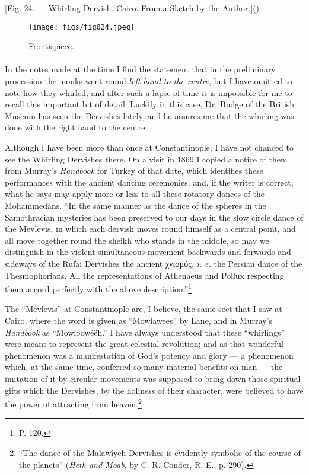 \documentclass[a4paper, 11pt, oneside, polutonikogreek, english]{article}
\begin{document}
[Fig. 24. --- Whirling Dervish. Cairo. From a Sketch by the Author.]()
\begin{figure}[H]
\centering
\texttt{[image: figs/fig024.jpeg]}
\caption{Frontispiece.}
\end{figure}
\paragraph{}
In the notes made at the time I find the statement that in the preliminary procession the monks went round \emph{left hand to the centre}, but I have omitted to note how they whirled; and after such a lapse of time it is impossible for me to recall this important bit of detail. Luckily in this case, Dr. Budge of the British Museum has seen the Dervishes lately, and he assures me that the whirling was done with the right hand to the centre.

Although I have been more than once at Constantinople, I have not chanced to see the Whirling Dervishes there. On a visit in 1869 I copied a notice of them from Murray's \emph{Handbook} for Turkey of that date, which identifies these performances with the ancient dancing ceremonies; and, if the writer is correct, what he says may apply more or less to all these rotatory dances of the Mohammedans. ``In the same manner as the dance of the spheres in the Samothracian mysteries has been preserved to our days in the slow circle dance of the Mevlevis, in which each dervish moves round himself as a central point, and all move together round the sheikh who stands in the middle, so may we distinguish in the violent simultaneous movement backwards and forwards and sideways of the Rufai Dervishes the ancient χνισμός, \emph{i. e.} the Persian dance of the Thesmophorians. All the representations of Athenaeus and Pollux respecting them accord perfectly with the above description.''\footnote{P. 120.}

The ``Mevlevis'' at Constantinople are, I believe, the same sect that I saw at Cairo, where the word is given as ``Mowlawees'' by Lane, and in Murray's \emph{Handbook} as ``Mowloowéëh.'' I have always understood that these ``whirlings'' were meant to represent the great celestial revolution; and as that wonderful phenomenon was a manifestation of God's potency and glory --- a phenomenon which, at the same time, conferred so many material benefits on man --- the imitation of it by circular movements was supposed to bring down those spiritual gifts which the Dervishes, by the holiness of their character, were believed to have the power of attracting from heaven.\footnote{``The dance of the Malawîyeh Dervishes is evidently symbolic of the course of the planets'' (\emph{Heth and Moab}, by C. R. Conder, R. E., p. 290).}
\clearpage
\end{document}
